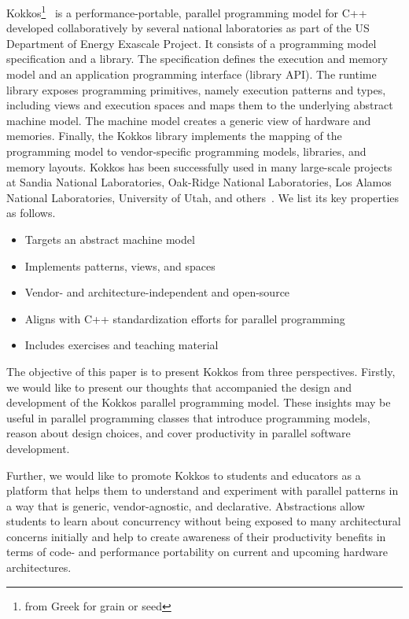 Kokkos\footnote{from Greek for grain or seed}~\cite{KOKKOS} is a performance-portable, parallel programming model for C++ developed collaboratively by several national laboratories as part of the US Department of Energy Exascale Project\cite{ECP}. It consists of a programming model specification and a library. The specification defines the execution and memory model and an application programming interface (library API). The runtime library exposes programming primitives, namely execution patterns and types, including views and execution spaces and maps them to the underlying abstract machine model. The machine model creates a generic view of hardware and memories. Finally, the Kokkos library implements the mapping of the programming model to vendor-specific programming models, libraries, and memory layouts. Kokkos has been successfully used in many large-scale projects at Sandia National Laboratories, Oak-Ridge National Laboratories, Los Alamos National Laboratories, University of Utah, and others~\cite{KOKKOSPROJS}. We list its key properties as follows.

\begin{itemize}
\item Targets an abstract machine model
\item Implements patterns, views, and spaces
\item Vendor- and architecture-independent and open-source
\item Aligns with C++ standardization efforts for parallel programming
\item Includes exercises and teaching material
\end{itemize}

The objective of this paper is to present Kokkos from three perspectives. Firstly, we would like to present our thoughts that accompanied the design and development of the Kokkos parallel programming model. These insights may be useful in parallel programming classes that introduce programming models, reason about design choices, and cover productivity in parallel software development.

Further, we would like to promote Kokkos to students and educators as a platform that helps them to understand and experiment with parallel patterns in a way that is generic, vendor-agnostic, and declarative. Abstractions allow students to learn about concurrency without being exposed to many architectural concerns initially and help to create awareness of their productivity benefits in terms of code- and performance portability on current and upcoming hardware architectures.

